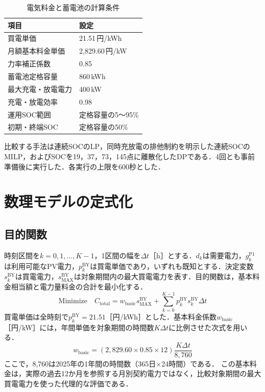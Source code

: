 \documentclass[a4paper,11pt,xelatex,ja=standard]{bxjsarticle}
\begin{document}
\begin{table}[htbp]
    \centering
    \caption{電気料金と蓄電池の計算条件}
    \label{tab:system-conditions}
    \begin{tabular}{p{46mm}p{91mm}}
        \toprule
        項目        & 設定             \\
        \midrule
        買電単価      & 21.51\,円/kWh   \\
        月額基本料金単価  & 2,829.60\,円/kW \\
        力率補正係数    & 0.85           \\
        蓄電池定格容量   & 860\,kWh       \\
        最大充電・放電電力 & 400\,kW        \\
        充電・放電効率   & 0.98           \\
        運用SOC範囲   & 定格容量の5～95\%    \\
        初期・終端SOC  & 定格容量の50\%      \\
        \bottomrule
    \end{tabular}
\end{table}

比較する手法は連続SOCのLP，同時充放電の排他制約を明示した連続SOCのMILP，およびSOCを19，37，73，145点に離散化したDPである．4回とも事前準備後に実行した．各実行の上限を600秒とした．

\section{数理モデルの定式化}
\subsection{目的関数}
時刻区間を$k=0,1,\ldots,K-1$，1区間の幅を$\Delta t$［h］とする．$d_k$は需要電力，$g^{\mathrm{P1}}_k$は利用可能なPV電力，$p^{\mathrm{BY}}_k$は買電単価であり，いずれも既知とする．決定変数$s^{\mathrm{BY}}_k$は買電電力，$s^{\mathrm{BY}}_{\mathrm{MAX}}$は対象期間内の最大買電電力を表す．目的関数は，基本料金相当額と電力量料金の合計を最小化する．
\begin{equation}
    \text{Minimize}\quad C_{\mathrm{total}}
    = w_{\mathrm{basic}}s^{\mathrm{BY}}_{\mathrm{MAX}}
    + \sum_{k=0}^{K-1}p^{\mathrm{BY}}_k s^{\mathrm{BY}}_k\Delta t
    \label{eq:objective}
\end{equation}
買電単価は全時刻で$p^{\mathrm{BY}}_k=21.51$［円/kWh］とした．基本料金係数$w_{\mathrm{basic}}$［円/kW］には，年間単価を対象期間の時間数$K\Delta t$に比例させた次式を用いる．
\begin{equation}
    w_{\mathrm{basic}}
    = (2{,}829.60\times0.85\times12)
    \frac{K\Delta t}{8{,}760}
    \label{eq:basic-weight}
\end{equation}
ここで，8,760は2025年の1年間の時間数（365日$\times$24時間）である．
この基本料金は，実際の過去12か月を参照する月別契約電力ではなく，比較対象期間の最大買電電力を使った代理的な評価である．
\end{document}
